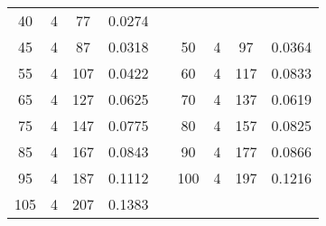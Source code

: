 \documentclass[a4paper, 12pt, french,oneside]{book}
\begin{document}
\begin{table}[!ht]
\begin{tabularx}{\linewidth}{|c|c|c|c|X|c|c|c|c|}
        40           & 4            & 77              & 0.0274                                                                                                           \\

        45           & 4            & 87              & 0.0318                        &  &

        50           & 4            & 97              & 0.0364                                                                                                           \\

        55           & 4            & 107             & 0.0422                        &  &

        60           & 4            & 117             & 0.0833                                                                                                           \\

        65           & 4            & 127             & 0.0625                        &  &

        70           & 4            & 137             & 0.0619                                                                                                           \\

        75           & 4            & 147             & 0.0775                        &  &

        80           & 4            & 157             & 0.0825                                                                                                           \\

        85           & 4            & 167             & 0.0843                        &  &

        90           & 4            & 177             & 0.0866                                                                                                           \\

        95           & 4            & 187             & 0.1112                        &  &

        100          & 4            & 197             & 0.1216                                                                                                           \\

        105          & 4            & 207             & 0.1383                        &  &


\end{tabularx}
\end{table}
\end{document}
